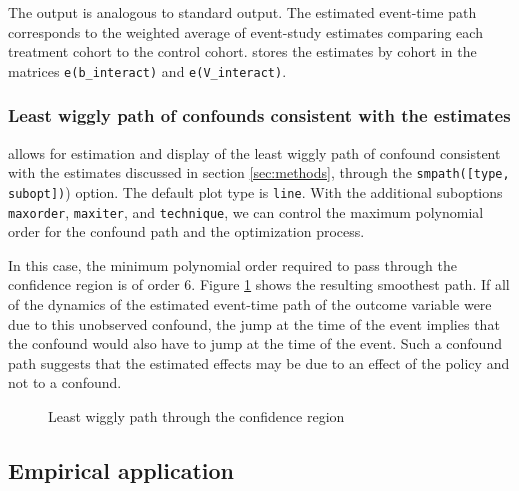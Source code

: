 \documentclass[12pt]{article}
\begin{document}
\begin{stlog}
	\nullskip
\end{stlog}

The output is analogous to standard \xtevent output.
The estimated event-time path corresponds to the weighted average of event-study estimates comparing each treatment cohort to the control cohort.
\xtevent stores the estimates by cohort in the matrices \texttt{e(b\_interact)} and \texttt{e(V\_interact)}.

\subsubsection*{Least wiggly path of confounds consistent with the estimates}

\xteventplot allows for estimation and display of the least wiggly path of confound consistent with the estimates discussed in section \ref{sec:methods}, through the \texttt{smpath([type, subopt])}) option.
The default plot type is \texttt{line}.
With the additional suboptions \texttt{maxorder}, \texttt{maxiter}, and \texttt{technique}, we can control the maximum polynomial order for the confound path and the optimization process.

\begin{stlog}
	\nullskip
\end{stlog}

In this case, the minimum polynomial order required to pass through the confidence region is of order 6.
Figure \ref{fig:smpath} shows the resulting smoothest path.
If all of the dynamics of the estimated event-time path of the outcome variable were due to this unobserved confound, the jump at the time of the event implies that the confound would also have to jump at the time of the event.
Such a confound path suggests that the estimated effects may be due to an effect of the policy and not to a confound.

\begin{figure}[h!]
	\begin{center}
	\end{center}
	\caption{Least wiggly path through the confidence region}
	\label{fig:smpath}
\end{figure}

\subsection{Empirical application}\label{sec:app}
\end{document}
